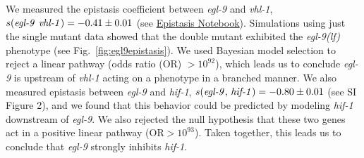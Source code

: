 \documentclass[9pt,twocolumn,twoside]{pnas-new}
\newcommand{\gene}[1]{\mbox{\emph{#1}}}
\newcommand{\egl}{\gene{egl-9(lf)}}
\begin{document}
We measured the epistasis coefficient between \gene{egl-9} and \gene{vhl-1},
$s({\text{\gene{egl-9} \gene{vhl-1}}}) = -0.41\pm 0.01$ (see
\href{https://wormlabcaltech.github.io/mprsq/analysis_notebooks/6_epistasis.html}
{Epistasis Notebook}). Simulations using just the single mutant data showed that
the double mutant exhibited the \egl{} phenotype (see
Fig.~\ref{fig:egl9epistasis}). We used Bayesian model selection to reject a
linear pathway (odds ratio (OR) $>10^{92}$), which leads us to conclude
\gene{egl-9} is upstream of \gene{vhl-1} acting on a phenotype in a branched
manner. We also measured epistasis between \gene{egl-9} and \gene{hif-1},
$s({\text{\gene{egl-9}, \gene{hif-1}}}) = -0.80\pm0.01$ (see SI Figure 2), and
we found that this behavior could be predicted by modeling \gene{hif-1}
downstream of \gene{egl-9}. We also rejected the null hypothesis that these two
genes act in a positive linear pathway (OR$> 10^{93}$). Taken together, this
leads us to conclude that \gene{egl-9} strongly inhibits \gene{hif-1}.
\end{document}
